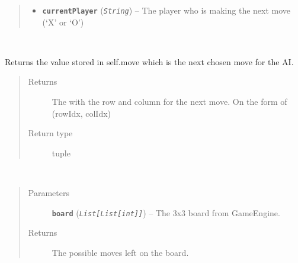\documentclass[letterpaper,10pt,english]{sphinxmanual}
\begin{document}
\begin{fulllineitems}
\begin{fulllineitems}
\begin{quote}
\begin{description}
\begin{itemize}
\item {} 
\textbf{\texttt{currentPlayer}} (\emph{\texttt{String}}) -- The player who is making the next move (`X' or `O')

\end{itemize}

\end{description}\end{quote}

\end{fulllineitems}


\end{fulllineitems}


\begin{fulllineitems}
\label{index:AI._AIMedium}~

\begin{fulllineitems}
\label{index:AI._AIMedium.getMove}
Returns the value stored in self.move which is the next chosen move for the AI.
\begin{quote}\begin{description}
\item[{Returns}] \leavevmode
The with the row and column for the next move. On the form of (rowIdx, colIdx)

\item[{Return type}] \leavevmode
tuple

\end{description}\end{quote}

\end{fulllineitems}


\begin{fulllineitems}
\label{index:AI._AIMedium.getPossibleMoves}~\begin{quote}\begin{description}
\item[{Parameters}] \leavevmode
\textbf{\texttt{board}} (\emph{\texttt{List{[}List{[}int{]}{]}}}) -- The 3x3 board from GameEngine.

\item[{Returns}] \leavevmode
The possible moves left on the board.


\end{description}
\end{quote}
\end{fulllineitems}
\end{fulllineitems}
\end{document}
